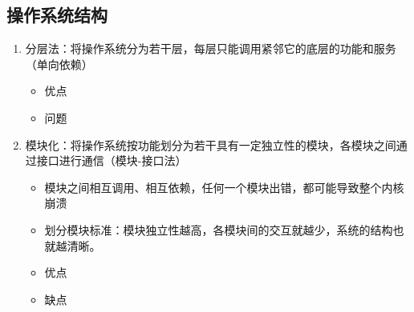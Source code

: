 \documentclass[./operating-systems.tex]{subfiles}
\begin{document}
    \subsection{操作系统结构}

    \begin{enumerate}
        \item 分层法：将操作系统分为若干层，每层只能调用紧邻它的底层的功能和服务（单向依赖）
        \begin{itemize}
            \item 优点
            \item 问题
        \end{itemize}
        \item 模块化：将操作系统按功能划分为若干具有一定独立性的模块，各模块之间通过接口进行通信（模块-接口法）
        \begin{itemize}
            \item 模块之间相互调用、相互依赖，任何一个模块出错，都可能导致整个内核崩溃
            \item 划分模块标准：模块独立性越高，各模块间的交互就越少，系统的结构也就越清晰。{\color{red}{高内聚、低耦合}}
            \item 优点
            \item 缺点
        \end{itemize}

\end{enumerate}
\end{document}
